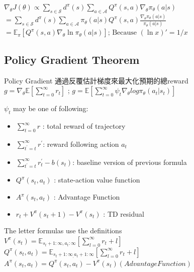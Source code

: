 \documentclass[14pt,a4paper]{report}  %
\begin{document}
$\nabla_\theta J(\theta)
\propto \sum_{s \in \mathcal{S}} d^\pi(s) \sum_{a \in \mathcal{A}} Q^\pi(s, a) \nabla_\theta \pi_\theta(a \vert s) $\\[5pt]
$= \sum_{s \in \mathcal{S}} d^\pi(s) \sum_{a \in \mathcal{A}} \pi_\theta(a \vert s) Q^\pi(s, a) \frac{\nabla_\theta \pi_\theta(a \vert s)}{\pi_\theta(a \vert s)} $\\[5pt]
$= \mathbb{E}_\pi [Q^\pi(s, a) \nabla_\theta \ln \pi_\theta(a \vert s)]  \scriptstyle{\text{; Because } (\ln x)' = 1/x}$
\\[5pt]
\subsection{Policy Gradient Theorem}
Policy Gradient 通過反覆估計梯度來最大化預期的總reward\\[5pt]
$g = \nabla_\theta\mathbb{E}[\sum_{t=0}^\infty r_t]$ ; $g = \mathbb{E}[\sum_{t=0}^\infty\psi_t\nabla_\theta log\pi_\theta(a_t \vert s_t)]$\\[5pt]
\begin{normalsize}{$\psi_t$ may be one of following:}\end{normalsize}
\begin{itemize}
\item $\sum_{t=0}^\infty r$ : total reward of trajectory
\item $\sum_{t^{'}=t}^\infty r^{'}$: reward following action $a_t$
\item $\sum_{t^{'}=t}^\infty r_t^{'}-b(s_t)$: baseline version of previous formula
\item $Q^\pi(s_t,a_t)$ : state-action value function
\item $A^\pi(s_t,a_t)$ : Advantage Function
\item $r_t+V^\pi(s_t+1)-V^\pi(s_t)$ : TD residual
\end{itemize}
The letter formulas use the definitions\\[5pt]
$V^\pi(s_t) = \mathbb{E}_{s_{t}+1:\infty,a_{t}:\infty}[\sum_{l=0}^\infty r_t+l]$\\[5pt]
$Q^\pi(s_t,a_t) = \mathbb{E}_{s_{t}+1:\infty_,a_{t}+1:\infty}[\sum_{l=0}^\infty r_t+l]$\\[5pt]
$A^\pi(s_t,a_t) = Q^\pi(s_t,a_t)-V^\pi(s_t)(Advantage Function)$\\[5pt]
\end{document}

